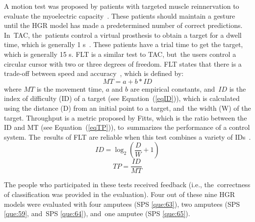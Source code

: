 \documentclass[sensors,review,accept,moreauthors,pdftex]{Definitions/mdpi}
\begin{document}
A motion test was proposed by patients with targeted muscle reinnervation to evaluate the myoelectric capacity~\cite{kuiken2009targeted}. These patients should maintain a gesture until the HGR model has made a predetermined number of correct predictions. In~TAC, the~patients control a virtual prosthesis to obtain a target for a dwell time, which is generally 1 s~\cite{simon2011target}. These patients have a trial time to get the target, which is generally 15 s. FLT is a similar test to TAC, but~the users control a circular cursor with two or three degrees of freedom. FLT states that there is a trade-off between speed and accuracy~\cite{fitts1954information, scheme2012validation}, which is defined by:
\begin{equation} \label{eqMT}
MT=a+b*ID
\end{equation}
where
\begin{math}
MT
\end{math} is the movement time, 
\begin{math}
a
\end{math} and
\begin{math}
b
\end{math} are empirical constants, and~\begin{math}
ID
\end{math} is the index of difficulty (ID) of a target (see Equation~(\ref{eqID})), which is calculated using the distance (D) from an initial point to a target, and~the width (W) of the target. Throughput is a metric proposed by Fitts, which is the ratio between the ID and MT (see Equation~(\ref{eqTP})), to~summarizes the performance of a control system. The~results of FLT are reliable when this test combines a variety of IDs~\cite{soukoreff2004towards}.
\begin{equation} \label{eqID}
ID=\log_2(\frac{D}{W}+1)
\end{equation}
\begin{equation} \label{eqTP}
TP=\frac{ID}{MT}
\end{equation}



The people who participated in these tests received feedback (i.e., the~correctness of classification was provided in the evaluation). Four out of these nine HGR models were evaluated with four amputees (SPS \ref{que:63}), two amputees (SPS \ref{que:59}, and~SPS \ref{que:64}), and~one amputee (SPS \ref{que:65}).
\end{document}
